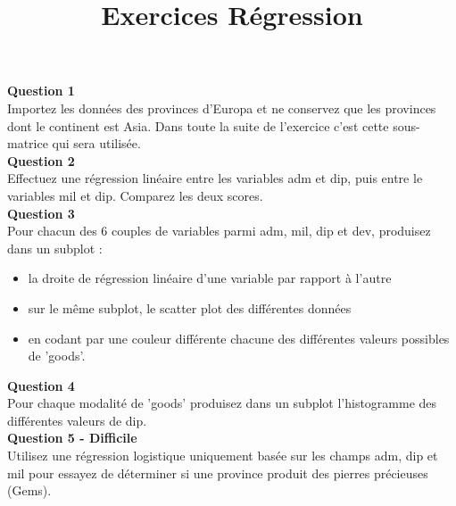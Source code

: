 \documentclass[a4paper]{article}
\title{Exercices Régression}
\date{}
\begin{document}
\maketitle

\textbf{Question 1}\\

Importez les données des provinces d'Europa et ne conservez que les provinces dont le continent est Asia. Dans toute la suite de l'exercice c'est cette sous-matrice qui sera utilisée.\\

\textbf{Question 2}\\

Effectuez une régression linéaire entre les variables adm et dip, puis entre le variables mil et dip. Comparez les deux scores.\\

\textbf{Question 3}\\

Pour chacun des 6 couples de variables parmi adm, mil, dip et dev, produisez dans un subplot :
\begin{itemize}
\item la droite de régression linéaire d'une variable par rapport à l'autre
\item sur le même subplot, le scatter plot des différentes données
\item en codant par une couleur différente chacune des différentes valeurs possibles de 'goods'.
\end{itemize}

\textbf{Question 4}\\

Pour chaque modalité de 'goods' produisez dans un subplot l'histogramme des différentes valeurs de dip.\\

\textbf{Question 5 - Difficile}\\

Utilisez une régression logistique uniquement basée sur les champs adm, dip et mil pour essayez de déterminer si une province produit des pierres précieuses (Gems).
\end{document}

